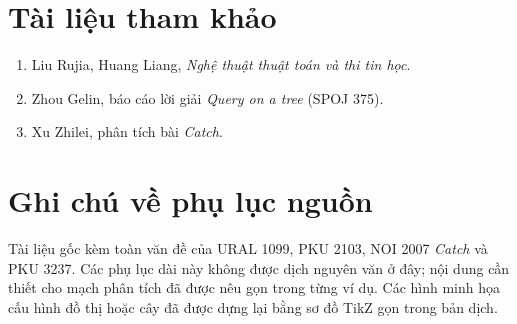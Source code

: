 \documentclass[11pt]{article}
\begin{document}
\section*{Tài liệu tham khảo}

\begin{enumerate}
  \item Liu Rujia, Huang Liang, \emph{Nghệ thuật thuật toán và thi tin học}.
  \item Zhou Gelin, báo cáo lời giải \emph{Query on a tree} (SPOJ 375).
  \item Xu Zhilei, phân tích bài \emph{Catch}.
\end{enumerate}

\section*{Ghi chú về phụ lục nguồn}

Tài liệu gốc kèm toàn văn đề của URAL 1099, PKU 2103, NOI 2007
\emph{Catch} và PKU 3237. Các phụ lục dài này không được dịch nguyên văn ở
đây; nội dung cần thiết cho mạch phân tích đã được nêu gọn trong từng ví dụ.
Các hình minh họa cấu hình đồ thị hoặc cây đã được dựng lại bằng sơ đồ
TikZ gọn trong bản dịch.
\end{document}

